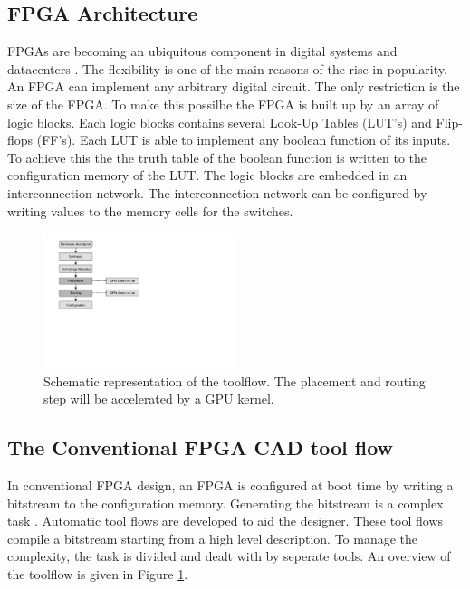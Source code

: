 \documentclass[a4paper,oneside,12pt]{article}
\begin{document}
\subsection{FPGA Architecture}
FPGAs are becoming an ubiquitous component in digital systems and datacenters \cite{ovtcharov2015accelerating,putnam2015reconfigurable}. The flexibility is one of the main reasons of the rise in popularity. An FPGA can implement any arbitrary digital circuit. The only restriction is the size of the FPGA. To make this possilbe the FPGA is built up by an array of logic blocks. Each logic blocks contains several Look-Up Tables (LUT's) and Flip-flops (FF's). Each LUT is able to implement any boolean function of its inputs. To achieve this the the truth table of the boolean function is written to the configuration memory of the LUT. The logic blocks are embedded in an interconnection network. The interconnection network can be configured by writing values to the memory cells for the switches.

\begin{figure}[t]
\centering
\includegraphics[width = 0.50\textwidth,trim = 0mm 90mm 140mm 2mm, clip]{toolflow}
\caption{Schematic representation of the toolflow. The placement and routing step will be accelerated by a GPU kernel.}
\label{toolflow}
\end{figure}

\subsection{The Conventional FPGA CAD tool flow}

In conventional FPGA design, an FPGA is configured at boot time by writing a bitstream to the configuration memory. Generating the bitstream is a complex task . 
Automatic tool flows are developed to aid the designer. These tool flows compile a bitstream starting from a high level description. To manage the complexity, the task is divided and dealt with by seperate tools. An overview of the toolflow is given in Figure \ref{toolflow}. 
\end{document}
